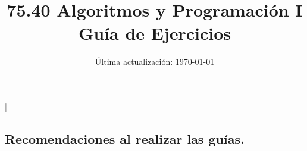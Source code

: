 \documentclass[11pt,spanish,a4paper,twoside,openany]{book}
\title{75.40 Algoritmos y Programación I \\
    \textbf{Guía de Ejercicios}}
\date{Última actualización: \today}
\theoremstyle{definition}
\theoremstyle{definition}
\theoremstyle{remark}
\begin{document}

\begin{extract*}
\lstMakeShortInline[style=inlinecode]|
\end{extract*}

\begin{extract} %
\maketitle
\thispagestyle{empty}

\newpage

\section*{Recomendaciones al realizar las guías.}


\end{extract}
\end{document}
